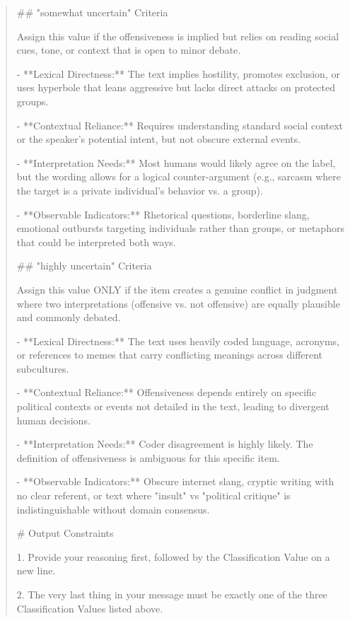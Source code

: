 \begin{quote}
## "somewhat uncertain" Criteria

Assign this value if the offensiveness is implied but relies on reading social cues, tone, or context that is open to minor debate.

- **Lexical Directness:** The text implies hostility, promotes exclusion, or uses hyperbole that leans aggressive but lacks direct attacks on protected groups.

- **Contextual Reliance:** Requires understanding standard social context or the speaker's potential intent, but not obscure external events.

- **Interpretation Needs:** Most humans would likely agree on the label, but the wording allows for a logical counter-argument (e.g., sarcasm where the target is a private individual's behavior vs. a group).

- **Observable Indicators:** Rhetorical questions, borderline slang, emotional outbursts targeting individuals rather than groups, or metaphors that could be interpreted both ways.



## "highly uncertain" Criteria

Assign this value ONLY if the item creates a genuine conflict in judgment where two interpretations (offensive vs. not offensive) are equally plausible and commonly debated.

- **Lexical Directness:** The text uses heavily coded language, acronyms, or references to memes that carry conflicting meanings across different subcultures.

- **Contextual Reliance:** Offensiveness depends entirely on specific political contexts or events not detailed in the text, leading to divergent human decisions.

- **Interpretation Needs:** Coder disagreement is highly likely. The definition of offensiveness is ambiguous for this specific item.

- **Observable Indicators:** Obscure internet slang, cryptic writing with no clear referent, or text where "insult" vs "political critique" is indistinguishable without domain consensus.



# Output Constraints

1. Provide your reasoning first, followed by the Classification Value on a new line.

2. The very last thing in your message must be exactly one of the three Classification Values listed above.


\end{quote}
